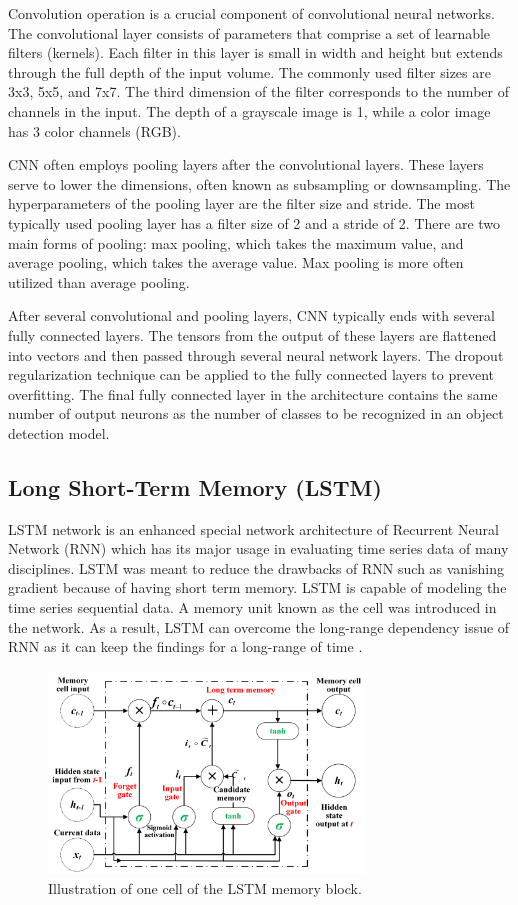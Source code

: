 Convolution operation is a crucial component of convolutional neural networks. The convolutional layer consists of parameters that comprise a set of learnable filters (kernels). Each filter in this layer is small in width and height but extends through the full depth of the input volume. The commonly used filter sizes are 3x3, 5x5, and 7x7. The third dimension of the filter corresponds to the number of channels in the input. The depth of a grayscale image is 1, while a color image has 3 color channels (RGB).

CNN often employs pooling layers after the convolutional layers. These layers serve to lower the dimensions, often known as subsampling or downsampling. The hyperparameters of the pooling layer are the filter size and stride. The most typically used pooling layer has a filter size of 2 and a stride of 2. There are two main forms of pooling: max pooling, which takes the maximum value, and average pooling, which takes the average value. Max pooling is more often utilized than average pooling.

After several convolutional and pooling layers, CNN typically ends with several fully connected layers. The tensors from the output of these layers are flattened into vectors and then passed through several neural network layers. The dropout regularization technique can be applied to the fully connected layers to prevent overfitting. The final fully connected layer in the architecture contains the same number of output neurons as the number of classes to be recognized in an object detection model.

\subsection{Long Short-Term Memory (LSTM)}
LSTM network is an enhanced special network architecture of Recurrent Neural Network (RNN) \cite{RNN} which has its major usage in evaluating time series data of many disciplines. LSTM was meant to reduce the drawbacks of RNN such as vanishing gradient because of having short term memory. LSTM is capable of modeling the time series sequential data. A memory unit known as the cell was introduced in the network. As a result, LSTM can overcome the long-range dependency issue of RNN as it can keep the findings for a long-range of time \cite{LSTM1}.

\begin{figure}[H]
    \centering
    \includegraphics[width=0.75\textwidth]{bab2/ar_OneCellLSTM.png}
    \caption{Illustration of one cell of the LSTM memory block.}
    \label{fig:OneCellLSTM}
\end{figure}

